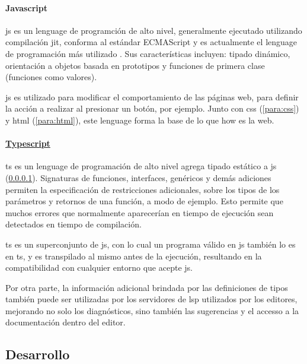 \paragraph{Javascript}\label{para:js}
\acrfull{js} es un lenguage de programción de alto nivel, generalmente ejecutado utilizando compilación \acrfull{jit}, conforma al estándar ECMAScript \cite{ecmascript} y es actualmente el lenguage de programación más utilizado \cite{devSurvey2024}. Sus características incluyen: tipado dinámico, orientación a objetos basada en prototipos y funciones de primera clase (funciones como valores).

\acrshort{js} es utilizado para modificar el comportamiento de las páginas web, para definir la acción a realizar al presionar un botón, por ejemplo. Junto con \acrshort{css} (\cref{para:css}) y \acrshort{html} (\cref{para:html}), este lenguage forma la base de lo que how es la web.

\paragraph{\href{https://www.typescriptlang.org/}{Typescript}}
\acrfull{ts} es un lenguage de programación de alto nivel agrega tipado estático a \acrshort{js} (\cref{para:js}). Signaturas de funciones, interfaces, genéricos y demás adiciones permiten la especificación de restricciones adicionales, sobre los tipos de los parámetros y retornos de una función, a modo de ejemplo. Esto permite que muchos errores que normalmente aparecerían en tiempo de ejecución sean detectados en tiempo de compilación.

\acrshort{ts} es un superconjunto de \acrlong{js}, con lo cual un programa válido en \acrshort{js} también lo es en \acrshort{ts}, y es transpilado al mismo antes de la ejecución, resultando en la compatibilidad con cualquier entorno que acepte \acrlong{js}.

Por otra parte, la información adicional brindada por las definiciones de tipos también puede ser utilizadas por los servidores de \acrfull{lsp} utilizados por los editores, mejorando no solo los diagnósticos, sino también las sugerencias y el accesso a la documentación dentro del editor.

\subsection{Desarrollo}

